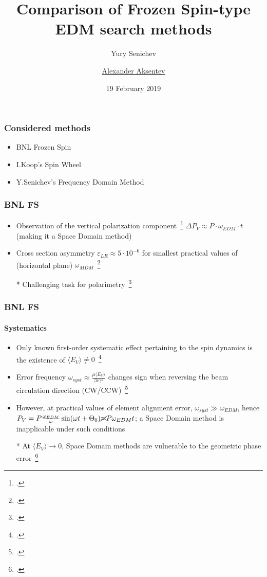 \documentclass{beamer}
\title{Comparison of Frozen Spin-type EDM search methods}
\author[shortname]{Yury Senichev \inst{1} \and \underline{Alexander Aksentev} \inst{2,3}}
\institute[shortinst]{\inst{1} Institute for Nuclear Research of RAS \and%
  \inst{2} Forschungszentrum J\"ulich \and%
  \inst{3} NRNU ``MEPhI''
}
\date{19 February 2019}
\newcommand{\w}{\omega}
\newcommand{\avg}[1]{\langle{#1}\rangle}
\begin{document}
\begin{frame}
  \titlepage
\end{frame}

\begin{frame}\frametitle{Considered methods}
  \begin{itemize}
  \item BNL Frozen Spin
  \item I.Koop's Spin Wheel
  \item Y.Senichev's Frequency Domain Method
  \end{itemize}
\end{frame}

\begin{frame}\frametitle{BNL FS}
  \begin{itemize}
  \item Observation of the vertical polarization component~\footcite[p.~9]{BNL:Deuteron2008}
    $\Delta P_V \approx P\cdot\w_{EDM}\cdot t$ (making it a Space Domain method)
  \item Cross section asymmetry $\varepsilon_{LR}\approx 5\cdot 10^{-6}$ for
    smallest practical values of (horizontal plane) $\w_{MDM}$~\footcite[p.~18]{BNL:Deuteron2008}
  \item[*] Challenging task for polarimetry~\footcite[p.~6]{Mane:SpinWheel}
  \end{itemize}
\end{frame}

\begin{frame}\frametitle{BNL FS}\framesubtitle{Systematics}
  \begin{itemize}
  \item Only known first-order systematic effect pertaining to the spin dynamics is the existence of
    $\avg{E_V}\neq 0$~\footcite[p.~10]{BNL:Deuteron2008}
  \item Error frequency $\w_{syst} \approx \frac{\mu\avg{E_V}}{\beta c\gamma^2}$ changes sign when reversing
    the beam circulation direction (CW/CCW)~\footcite[p.~11]{BNL:Deuteron2008}
  \item However, at practical values of element alignment error, $\w_{syst} \gg \w_{EDM}$, hence
    $P_V = P\frac{\w_{EDM}}{\w}\sin(\w t + \Theta_0) \cancel{\approx}P\w_{EDM} t$;
    a Space Domain method is inapplicable under such conditions
  \item[*] At $\avg{E_V}\rightarrow 0$, Space Domain methods are vulnerable to
    the geometric phase error~\footcite[p.~6]{BNL:Proton}
  \end{itemize}
\end{frame}
\end{document}
